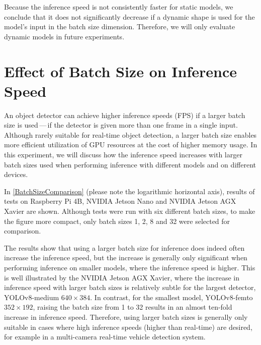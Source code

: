 Because the inference speed is not consistently faster for static models, we
conclude that it does not significantly decrease if a dynamic shape is used for
the model's input in the batch size dimension. Therefore, we will only evaluate
dynamic models in future experiments.








\section{Effect of Batch Size on Inference Speed}
\label{BatchSizeComparisonSection}

An object detector can achieve higher inference speeds (FPS) if a larger batch
size is used\,---\,if the detector is given more than one frame in a single
input. Although rarely suitable for real-time object detection, a larger batch
size enables more efficient utilization of GPU resources at the cost of higher
memory usage. In this experiment, we will discuss how the inference speed
increases with larger batch sizes used when performing inference with different
models and on different devices.

In \autoref{BatchSizeComparison} (please note the logarithmic horizontal axis),
results of tests on Raspberry Pi 4B, NVIDIA Jetson Nano and NVIDIA Jetson AGX
Xavier are shown. Although tests were run with six different batch sizes, to
make the figure more compact, only batch sizes 1, 2, 8 and 32 were selected for
comparison.

The results show that using a larger batch size for inference does indeed often
increase the inference speed, but the increase is generally only significant
when performing inference on smaller models, where the inference speed is
higher. This is well illustrated by the NVIDIA Jetson AGX Xavier, where the
increase in inference speed with larger batch sizes is relatively subtle for the
largest detector, YOLOv8-medium $640 \times 384$. In contrast, for the smallest
model, YOLOv8-femto $352 \times 192$, raising the batch size from 1 to 32
results in an almost ten-fold increase in inference speed. Therefore, using
larger batch sizes is generally only suitable in cases where high inference
speeds (higher than real-time) are desired, for example in a multi-camera
real-time vehicle detection system.






